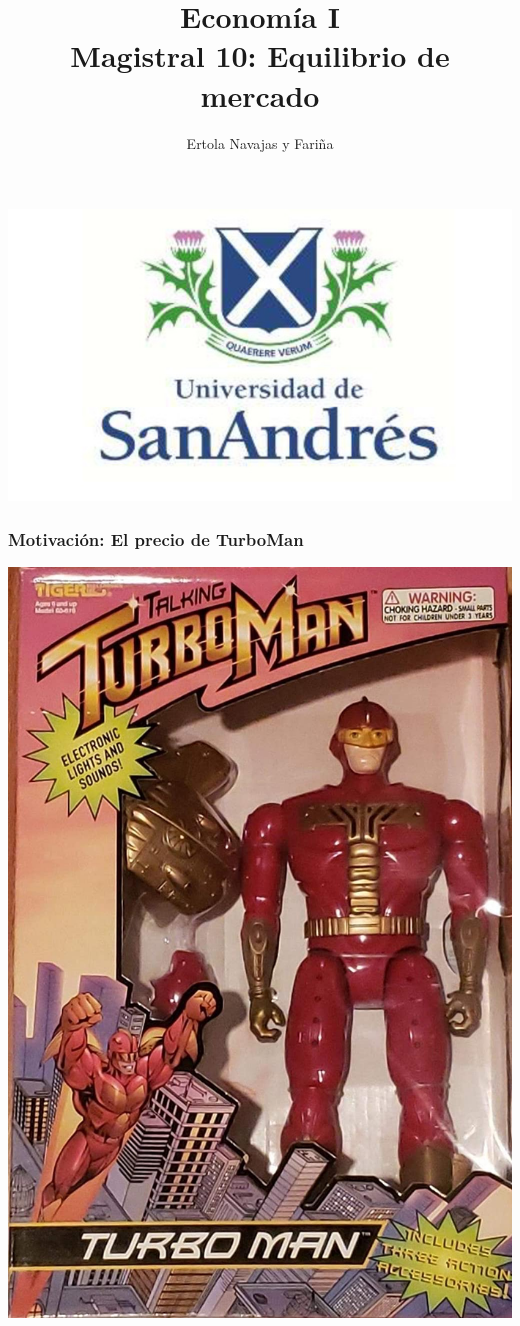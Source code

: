\documentclass{beamer}
\title[Economía I]{Economía I \vspace{4mm}
\\ Magistral 10: Equilibrio de mercado}
\date{}
\author[Ertola Navajas y Fariña]{Ertola Navajas y Fariña}
\institute[]{Universidad de San Andrés}
\begin{document}
\begin{frame}
\titlepage
\centering
\includegraphics[scale=0.2]{Slides Principios de Economia/Figures/logoUDESA.jpg} 
\end{frame} 

\begin{frame}
\frametitle{Motivación: El precio de TurboMan}
\centering
\href{https://www.youtube.com/watch?v=UIBRtxVG_LE&list=PL1Sd7Ozmz5CcoC_5lrL0pLKYXXLOLUhd2&index=12}{\includegraphics[scale=0.1]{Slides Principios de Economia/Figures/Tema_04.01_Turboman.jpg}}
\end{frame}
\end{document}
